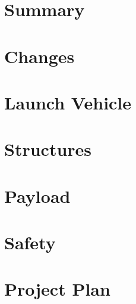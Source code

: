 \listoftodos

\listoffigures
	
\listoftables

\clearpage



\printglossary[type=\acronymtype]

\newpage

\tableofcontents



\part{Summary}



\part{Changes}

\part{Launch Vehicle}





\part{Structures}









\part{Payload}













%

\part{Safety}



\part{Project Plan}






